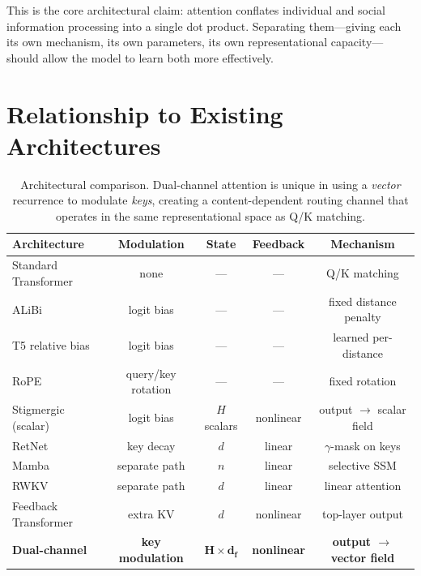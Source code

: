 \documentclass[11pt,a4paper]{article}
\begin{document}
This is the core architectural claim: attention conflates individual
and social information processing into a single dot product.
Separating them---giving each its own mechanism, its own
parameters, its own representational capacity---should allow the
model to learn both more effectively.


\section{Relationship to Existing Architectures}
\label{sec:related}

\begin{table}[h]
\centering
\small
\begin{tabular}{@{}lcccc@{}}
\toprule
\textbf{Architecture} & \textbf{Modulation} & \textbf{State}
& \textbf{Feedback} & \textbf{Mechanism} \\
\midrule
Standard Transformer & none & --- & --- & Q/K matching \\
ALiBi \cite{press2022alibi} & logit bias & --- & --- & fixed distance penalty \\
T5 relative bias & logit bias & --- & --- & learned per-distance \\
RoPE \cite{su2024rope} & query/key rotation & --- & --- & fixed rotation \\
\addlinespace
Stigmergic (scalar) & logit bias & $H$ scalars & nonlinear & output $\to$ scalar field \\
\addlinespace
RetNet \cite{sun2023retnet} & key decay & $d$ & linear & $\gamma$-mask on keys \\
Mamba \cite{gu2023mamba} & separate path & $n$ & linear & selective SSM \\
RWKV \cite{peng2023rwkv} & separate path & $d$ & linear & linear attention \\
Feedback Transformer & extra KV & $d$ & nonlinear & top-layer output \\
\addlinespace
\textbf{Dual-channel} & \textbf{key modulation} & $\bm{H \times d_f}$
& \textbf{nonlinear} & \textbf{output $\to$ vector field} \\
\bottomrule
\end{tabular}
\caption{Architectural comparison.  Dual-channel attention is unique
in using a \emph{vector} recurrence to modulate \emph{keys}, creating
a content-dependent routing channel that operates in the same
representational space as Q/K matching.}
\label{tab:comparison}
\end{table}
\end{document}
